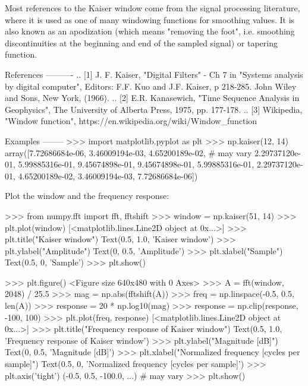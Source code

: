 \begin{DoxyVerb}
Most references to the Kaiser window come from the signal processing
literature, where it is used as one of many windowing functions for
smoothing values.  It is also known as an apodization (which means
"removing the foot", i.e. smoothing discontinuities at the beginning
and end of the sampled signal) or tapering function.

References
----------
.. [1] J. F. Kaiser, "Digital Filters" - Ch 7 in "Systems analysis by
       digital computer", Editors: F.F. Kuo and J.F. Kaiser, p 218-285.
       John Wiley and Sons, New York, (1966).
.. [2] E.R. Kanasewich, "Time Sequence Analysis in Geophysics", The
       University of Alberta Press, 1975, pp. 177-178.
.. [3] Wikipedia, "Window function",
       https://en.wikipedia.org/wiki/Window_function

Examples
--------
>>> import matplotlib.pyplot as plt
>>> np.kaiser(12, 14)
 array([7.72686684e-06, 3.46009194e-03, 4.65200189e-02, # may vary
        2.29737120e-01, 5.99885316e-01, 9.45674898e-01,
        9.45674898e-01, 5.99885316e-01, 2.29737120e-01,
        4.65200189e-02, 3.46009194e-03, 7.72686684e-06])


Plot the window and the frequency response:

>>> from numpy.fft import fft, fftshift
>>> window = np.kaiser(51, 14)
>>> plt.plot(window)
[<matplotlib.lines.Line2D object at 0x...>]
>>> plt.title("Kaiser window")
Text(0.5, 1.0, 'Kaiser window')
>>> plt.ylabel("Amplitude")
Text(0, 0.5, 'Amplitude')
>>> plt.xlabel("Sample")
Text(0.5, 0, 'Sample')
>>> plt.show()

>>> plt.figure()
<Figure size 640x480 with 0 Axes>
>>> A = fft(window, 2048) / 25.5
>>> mag = np.abs(fftshift(A))
>>> freq = np.linspace(-0.5, 0.5, len(A))
>>> response = 20 * np.log10(mag)
>>> response = np.clip(response, -100, 100)
>>> plt.plot(freq, response)
[<matplotlib.lines.Line2D object at 0x...>]
>>> plt.title("Frequency response of Kaiser window")
Text(0.5, 1.0, 'Frequency response of Kaiser window')
>>> plt.ylabel("Magnitude [dB]")
Text(0, 0.5, 'Magnitude [dB]')
>>> plt.xlabel("Normalized frequency [cycles per sample]")
Text(0.5, 0, 'Normalized frequency [cycles per sample]')
>>> plt.axis('tight')
(-0.5, 0.5, -100.0, ...) # may vary
>>> plt.show()\end{DoxyVerb}
 \mbox{\label{namespacenumpy_1_1lib_1_1function__base_a30af8c70291ee5c8dfc1073a16c2700c}} 
